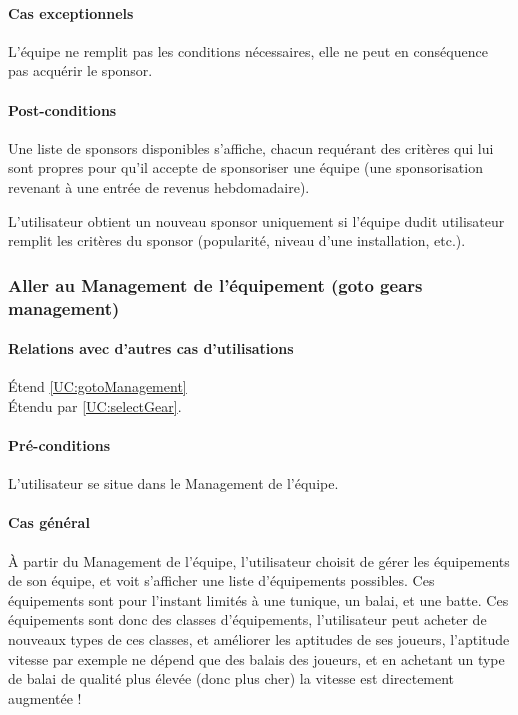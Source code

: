 \paragraph{Cas exceptionnels}
L'équipe ne remplit pas les conditions nécessaires, elle ne peut en conséquence pas acquérir le sponsor. 
\paragraph{Post-conditions}
\begin{list}{}{\leftmargin=1.5em}
\item{Une liste de sponsors disponibles s'affiche, chacun requérant des critères qui lui sont propres pour qu'il accepte de sponsoriser une équipe (une sponsorisation revenant à une entrée de revenus hebdomadaire).}
\item{L'utilisateur obtient un nouveau sponsor uniquement si l'équipe dudit utilisateur remplit les critères du sponsor (popularité, niveau d'une installation, etc.).}
\end{list}

\subsubsection{Aller au Management de l'équipement (goto gears management)}
\label{UC:gotoGear}
\paragraph{Relations avec d'autres cas d'utilisations}
Étend \ref{UC:gotoManagement}\\
Étendu par \ref{UC:selectGear}.
\paragraph{Pré-conditions}
\begin{list}{}{\leftmargin=1.5em}
\item{L'utilisateur se situe dans le Management de l'équipe.}
\end{list}
\paragraph{Cas général}
À partir du Management de l'équipe, l'utilisateur choisit de gérer les équipements de son équipe, et voit s'afficher une liste d'équipements possibles. Ces équipements sont pour l'instant limités à une tunique, un balai, et une batte. Ces équipements sont donc des classes d'équipements, l'utilisateur peut acheter de nouveaux types de ces classes, et améliorer les aptitudes de ses joueurs, l'aptitude vitesse par exemple ne dépend que des balais des joueurs, et en achetant un type de balai de qualité plus élevée (donc plus cher) la vitesse est directement augmentée !

